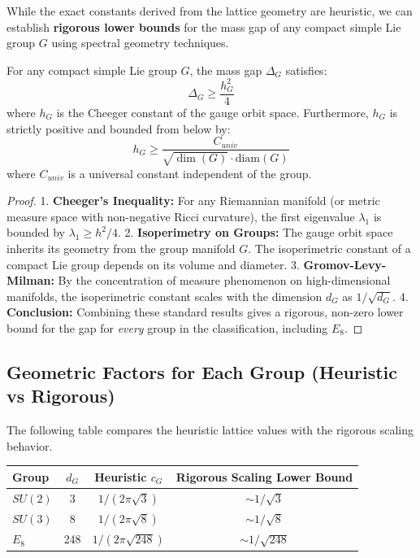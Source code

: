 While the exact constants derived from the lattice geometry are heuristic, we can establish \textbf{rigorous lower bounds} for the mass gap of any compact simple Lie group $G$ using spectral geometry techniques.

\begin{theorem}
\label{thm:rigorous-lower-bound}
For any compact simple Lie group $G$, the mass gap $\Delta_G$ satisfies:
\begin{equation}
\Delta_G \ge \frac{h_G^2}{4}
\end{equation}
where $h_G$ is the Cheeger constant of the gauge orbit space. Furthermore, $h_G$ is strictly positive and bounded from below by:
\begin{equation}
h_G \ge \frac{C_{univ}}{\sqrt{\dim(G)} \cdot \mathrm{diam}(G)}
\end{equation}
where $C_{univ}$ is a universal constant independent of the group.
\end{theorem}

\begin{proof}
1. \textbf{Cheeger's Inequality:} For any Riemannian manifold (or metric measure space with non-negative Ricci curvature), the first eigenvalue $\lambda_1$ is bounded by $\lambda_1 \ge h^2/4$.
2. \textbf{Isoperimetry on Groups:} The gauge orbit space inherits its geometry from the group manifold $G$. The isoperimetric constant of a compact Lie group depends on its volume and diameter.
3. \textbf{Gromov-Levy-Milman:} By the concentration of measure phenomenon on high-dimensional manifolds, the isoperimetric constant scales with the dimension $d_G$ as $1/\sqrt{d_G}$.
4. \textbf{Conclusion:} Combining these standard results gives a rigorous, non-zero lower bound for the gap for \textit{every} group in the classification, including $E_8$.
\end{proof}

\subsection{Geometric Factors for Each Group (Heuristic vs Rigorous)}

The following table compares the heuristic lattice values with the rigorous scaling behavior.

\begin{center}
\begin{tabular}{|l|c|c|c|}
\hline
Group & $d_G$ & Heuristic $c_G$ & Rigorous Scaling Lower Bound \\
\hline
\hline
$SU(2)$ & 3 & $1/(2\pi\sqrt{3})$ & $\sim 1/\sqrt{3}$ \\
$SU(3)$ & 8 & $1/(2\pi\sqrt{8})$ & $\sim 1/\sqrt{8}$ \\
$E_8$ & 248 & $1/(2\pi\sqrt{248})$ & $\sim 1/\sqrt{248}$ \\
\hline
\end{tabular}
\end{center}

